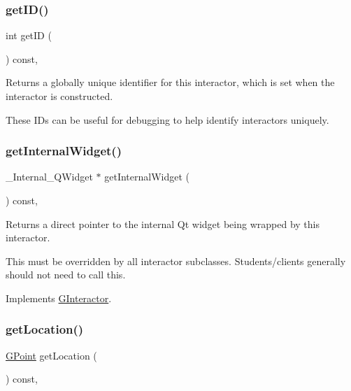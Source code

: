 \subsubsection{\texorpdfstring{get\+I\+D()}{getID()}}
{\footnotesize\ttfamily int get\+ID (\begin{DoxyParamCaption}{ }\end{DoxyParamCaption}) const\hspace{0.3cm}{\ttfamily [virtual]}, {\ttfamily [inherited]}}



Returns a globally unique identifier for this interactor, which is set when the interactor is constructed. 

These I\+Ds can be useful for debugging to help identify interactors uniquely. \mbox{\label{classsgl_1_1GTable_a2f6b36b2517087dc90a366b5ce1f5323}} 
\subsubsection{\texorpdfstring{get\+Internal\+Widget()}{getInternalWidget()}}
{\footnotesize\ttfamily \+\_\+\+Internal\+\_\+\+Q\+Widget $\ast$ get\+Internal\+Widget (\begin{DoxyParamCaption}{ }\end{DoxyParamCaption}) const\hspace{0.3cm}{\ttfamily [override]}, {\ttfamily [virtual]}}



Returns a direct pointer to the internal Qt widget being wrapped by this interactor. 

This must be overridden by all interactor subclasses. Students/clients generally should not need to call this. 

Implements \mbox{\hyperlink{classsgl_1_1GInteractor}{G\+Interactor}}.

\mbox{\label{classsgl_1_1GInteractor_a4f83802015511edeb63b892830812c11}} 
\subsubsection{\texorpdfstring{get\+Location()}{getLocation()}}
{\footnotesize\ttfamily \mbox{\hyperlink{structsgl_1_1GPoint}{G\+Point}} get\+Location (\begin{DoxyParamCaption}{ }\end{DoxyParamCaption}) const\hspace{0.3cm}{\ttfamily [virtual]}, {\ttfamily [inherited]}}



